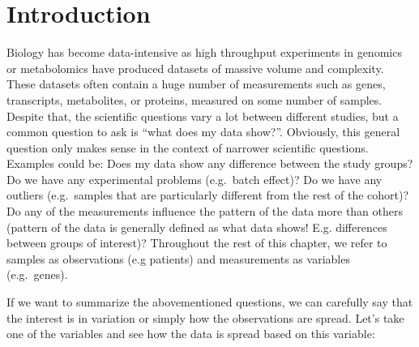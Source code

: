 \documentclass[
]{book}
\theoremstyle{definition}
\theoremstyle{definition}
\theoremstyle{definition}
\theoremstyle{remark}
\begin{document}
\hypertarget{intro}{%
\chapter{Introduction}\label{intro}}

Biology has become data-intensive as high throughput experiments in genomics or metabolomics have produced datasets of massive volume and complexity. These datasets often contain a huge number of measurements such as genes, transcripts, metabolites, or proteins, measured on some number of samples. Despite that, the scientific questions vary a lot between different studies, but a common question to ask is ``what does my data show?''. Obviously, this general question only makes sense in the context of narrower scientific questions. Examples could be: Does my data show any difference between the study groups? Do we have any experimental problems (e.g.~batch effect)? Do we have any outliers (e.g.~samples that are particularly different from the rest of the cohort)? Do any of the measurements influence the pattern of the data more than others (pattern of the data is generally defined as what data shows! E.g. differences between groups of interest)? Throughout the rest of this chapter, we refer to samples as observations (e.g patients) and measurements as variables (e.g.~genes).

If we want to summarize the abovementioned questions, we can carefully say that the interest is in variation or simply how the observations are spread. Let's take one of the variables and see how the data is spread based on this variable:
\end{document}
